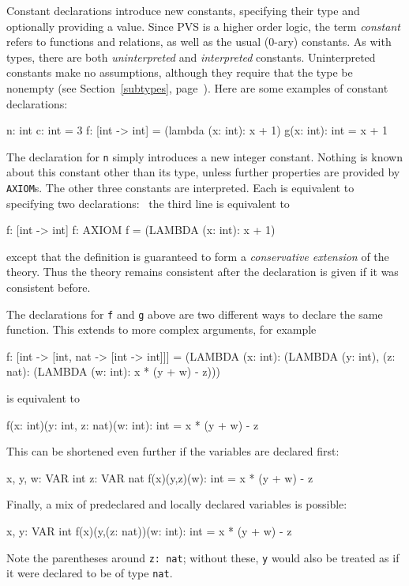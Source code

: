 Constant declarations introduce new constants, specifying their type and
optionally providing a value.  Since PVS is a higher order logic, the term
\emph{constant} refers to functions and relations, as well as the usual
(0-ary) constants.  As with types, there are both \emph{uninterpreted} and
\emph{interpreted} %
 constants.  Uninterpreted constants make
no assumptions, although they require that the type be nonempty (see
Section~\ref{subtypes}, page~\pageref{subtypes}).  Here are some examples
of constant declarations:
\begin{pvsex}
  n: int
  c: int = 3
  f: [int -> int] = (lambda (x: int): x + 1)
  g(x: int): int = x + 1
\end{pvsex}
%
The declaration for \texttt{n} simply introduces a new integer constant.
Nothing is known about this constant other than its type, unless further
properties are provided by \texttt{AXIOM}s.  The other three constants are
interpreted.  Each is equivalent to specifying two declarations: \eg\
the third line is equivalent to
\begin{pvsex}
  f: [int -> int]
  f: AXIOM  f = (LAMBDA (x: int): x + 1)
\end{pvsex}
%
except that the definition is guaranteed to form a \emph{conservative
extension}\index{conservative extension} of the theory.  Thus the
theory remains consistent after the declaration is given if it was
consistent before.

The declarations for \texttt{f} and \texttt{g} above are two different ways to
declare the same function.  This extends to more complex arguments, for
example
\begin{pvsex}
  f: [int -> [int, nat -> [int -> int]]] =
     (LAMBDA (x: int): (LAMBDA (y: int), (z: nat): (LAMBDA (w: int):
       x * (y + w) - z)))
\end{pvsex}
%
is equivalent to
\begin{pvsex}
  f(x: int)(y: int, z: nat)(w: int): int = x * (y + w) - z
\end{pvsex}
%
This can be shortened even further if the variables are declared first:
\begin{pvsex}
  x, y, w: VAR int
  z: VAR nat
  f(x)(y,z)(w): int = x * (y + w) - z
\end{pvsex}
%
Finally, a mix of predeclared and locally declared variables is possible:
\begin{pvsex}
  x, y: VAR int
  f(x)(y,(z: nat))(w: int): int = x * (y + w) - z
\end{pvsex}
%
Note the parentheses around \texttt{z:\ nat}; without these, \texttt{y} would
also be treated as if it were declared to be of type \texttt{nat}.


